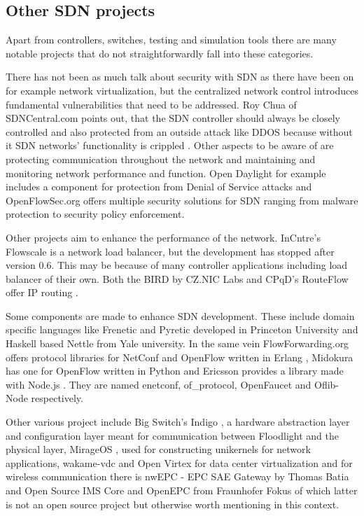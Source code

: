 \subsection{Other SDN projects}

Apart from controllers, switches, testing and simulation tools there are many notable projects that do not straightforwardly fall into these categories.

There has not been as much talk about security with SDN as there have been on for example network virtualization, but the centralized network control introduces fundamental vulnerabilities that need to be addressed. Roy Chua of SDNCentral.com points out, that the SDN controller should always be closely controlled and also protected from an outside attack like DDOS because without it SDN networks' functionality is crippled \cite{CHU2}. Other aspects to be aware of are protecting communication throughout the network and maintaining and monitoring network performance and function. Open Daylight for example includes a component for protection from Denial of Service attacks and OpenFlowSec.org offers multiple security solutions for SDN ranging from malware protection to security policy enforcement.

Other projects aim to enhance the performance of the network. InCntre’s Flowscale \cite{Flowscale} is a network load balancer, but the development has stopped after version 0.6. This may be because of many controller applications including load balancer of their own. Both the BIRD by CZ.NIC Labs and CPqD’s RouteFlow offer IP routing \cite{Bird, RouteFlow}.

Some components are made to enhance SDN development. These include domain specific languages like Frenetic and Pyretic developed in Princeton University \cite{Frenetic} and Haskell based Nettle \cite{Nettle} from Yale university. In the same vein FlowForwarding.org offers protocol libraries for NetConf and OpenFlow written in Erlang \cite{enetconf,ofproto}, Midokura has one for OpenFlow written in Python \cite{OpenFaucet} and Ericsson provides a library made with Node.js \cite{Node}. They are named enetconf, of\_protocol, OpenFaucet and Oflib-Node respectively. 

Other various project include Big Switch’s Indigo \cite{Indigo}, a hardware abstraction layer and configuration layer meant for communication between Floodlight and the physical layer, MirageOS \cite{Mirage}, used for constructing unikernels for network applications, wakame-vdc and Open Virtex for data center virtualization \cite{wakame, Virtex} and for wireless communication there is nwEPC - EPC SAE Gateway by Thomas Batia \cite{nwEPC} and Open Source IMS Core and OpenEPC from Fraunhofer Fokus \cite{IMSCORE, OpenEPC} of which latter is not an open source project but otherwise worth mentioning in this context. 

